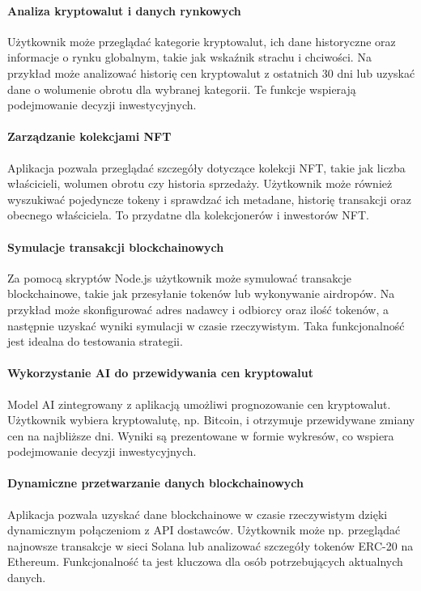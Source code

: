 \paragraph{Analiza kryptowalut i danych rynkowych}
Użytkownik może przeglądać kategorie kryptowalut, ich dane historyczne oraz informacje o rynku globalnym, takie jak wskaźnik strachu i chciwości. Na przykład może analizować historię cen kryptowalut z ostatnich 30 dni lub uzyskać dane o wolumenie obrotu dla wybranej kategorii. Te funkcje wspierają podejmowanie decyzji inwestycyjnych.

\paragraph{Zarządzanie kolekcjami NFT}
Aplikacja pozwala przeglądać szczegóły dotyczące kolekcji NFT, takie jak liczba właścicieli, wolumen obrotu czy historia sprzedaży. Użytkownik może również wyszukiwać pojedyncze tokeny i sprawdzać ich metadane, historię transakcji oraz obecnego właściciela. To przydatne dla kolekcjonerów i inwestorów NFT.

\paragraph{Symulacje transakcji blockchainowych}
Za pomocą skryptów Node.js użytkownik może symulować transakcje blockchainowe, takie jak przesyłanie tokenów lub wykonywanie airdropów. Na przykład może skonfigurować adres nadawcy i odbiorcy oraz ilość tokenów, a następnie uzyskać wyniki symulacji w czasie rzeczywistym. Taka funkcjonalność jest idealna do testowania strategii.

\paragraph{Wykorzystanie AI do przewidywania cen kryptowalut}
Model AI zintegrowany z aplikacją umożliwi prognozowanie cen kryptowalut. Użytkownik wybiera kryptowalutę, np. Bitcoin, i otrzymuje przewidywane zmiany cen na najbliższe dni. Wyniki są prezentowane w formie wykresów, co wspiera podejmowanie decyzji inwestycyjnych.

\paragraph{Dynamiczne przetwarzanie danych blockchainowych}
Aplikacja pozwala uzyskać dane blockchainowe w czasie rzeczywistym dzięki dynamicznym połączeniom z API dostawców. Użytkownik może np. przeglądać najnowsze transakcje w sieci Solana lub analizować szczegóły tokenów ERC-20 na Ethereum. Funkcjonalność ta jest kluczowa dla osób potrzebujących aktualnych danych.

